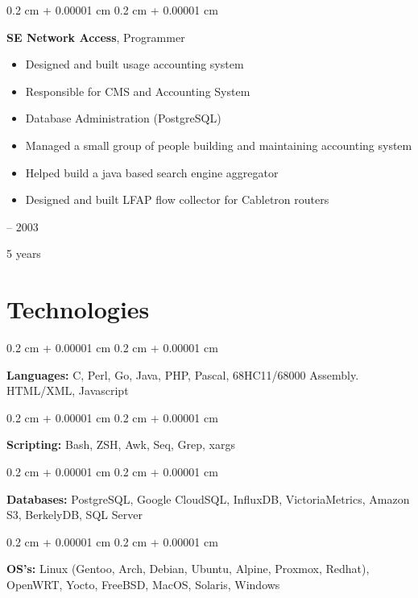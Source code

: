\documentclass[12pt, a4paper]{article}
\newenvironment{highlights}{
    \begin{itemize}[
        topsep=0.10 cm,
        parsep=0.10 cm,
        partopsep=0pt,
        itemsep=0pt,
        leftmargin=0.4 cm + 10pt
    ]
}{
    \end{itemize}
} %
\newenvironment{onecolentry}{
    \begin{adjustwidth}{
        0.2 cm + 0.00001 cm
    }{
        0.2 cm + 0.00001 cm
    }
}{
    \end{adjustwidth}
} %
\newenvironment{twocolentry}[2][]{
    \onecolentry
    \def\secondColumn{#2}
    \setcolumnwidth{\fill, 4.5 cm}
    \begin{paracol}{2}
}{
    \switchcolumn \raggedleft \secondColumn
    \end{paracol}
    \endonecolentry
} %
\begin{document}
        \begin{twocolentry}{
            1998 – 2003

        5 years
        }
            \textbf{SE Network Access}, Programmer
            \begin{highlights}
                \item Designed and built usage accounting system
                \item Responsible for CMS and Accounting System
                \item Database Administration (PostgreSQL)
                \item Managed a small group of people building and maintaining accounting system
                \item Helped build a java based search engine aggregator
                \item Designed and built LFAP flow collector for Cabletron routers
            \end{highlights}
        \end{twocolentry}



    
    \section{Technologies}



        
        \begin{onecolentry}
            \textbf{Languages:} C, Perl, Go, Java, PHP, Pascal, 68HC11/68000 Assembly. HTML/XML, Javascript
        \end{onecolentry}

        \vspace{0.2 cm}

        \begin{onecolentry}
            \textbf{Scripting:} Bash, ZSH, Awk, Seq, Grep, xargs
        \end{onecolentry}

        \vspace{0.2 cm}

        \begin{onecolentry}
            \textbf{Databases:} PostgreSQL, Google CloudSQL, InfluxDB, VictoriaMetrics, Amazon S3, BerkelyDB, SQL Server
        \end{onecolentry}

        \vspace{0.2 cm}

        \begin{onecolentry}
            \textbf{OS's:} Linux (Gentoo, Arch, Debian, Ubuntu, Alpine, Proxmox, Redhat), OpenWRT, Yocto, FreeBSD, MacOS, Solaris, Windows
        \end{onecolentry}
\end{document}
